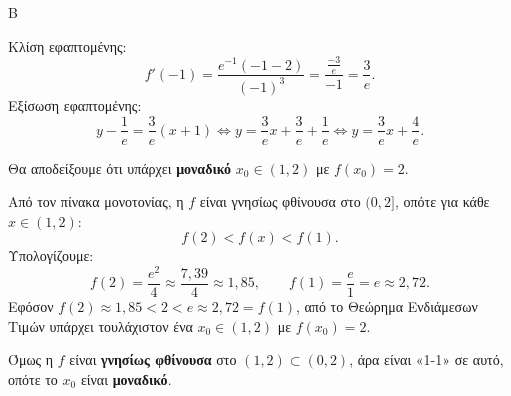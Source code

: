 \begin{thema}{Β}
\begin{erwthma}
Κλίση εφαπτομένης:
\[
f'(-1) = \frac{e^{-1}(-1-2)}{(-1)^3} = \frac{\frac{-3}{e}}{-1} = \frac{3}{e}.
\]
Εξίσωση εφαπτομένης:
\[
y - \frac{1}{e} = \frac{3}{e}(x+1) \Leftrightarrow y = \frac{3}{e}x + \frac{3}{e} + \frac{1}{e} \Leftrightarrow y = \frac{3}{e}x + \frac{4}{e}.
\]

\item Θα αποδείξουμε ότι υπάρχει \textbf{μοναδικό} $x_0 \in (1,2)$ με $f(x_0) = 2$.

Από τον πίνακα μονοτονίας, η $f$ είναι γνησίως φθίνουσα στο $(0, 2]$, οπότε για κάθε $x \in (1, 2)$:
\[
f(2) < f(x) < f(1).
\]
Υπολογίζουμε:
\[
f(2) = \frac{e^2}{4} \approx \frac{7{,}39}{4} \approx 1{,}85, \qquad f(1) = \frac{e}{1} = e \approx 2{,}72.
\]
Εφόσον $f(2) \approx 1{,}85 < 2 < e \approx 2{,}72 = f(1)$, από το Θεώρημα Ενδιάμεσων Τιμών υπάρχει τουλάχιστον ένα $x_0 \in (1,2)$ με $f(x_0) = 2$.

Όμως η $f$ είναι \textbf{γνησίως φθίνουσα} στο $(1,2) \subset (0,2)$, άρα είναι «1-1» σε αυτό, οπότε το $x_0$ είναι \textbf{μοναδικό}.

\end{erwthma}
\end{thema}

